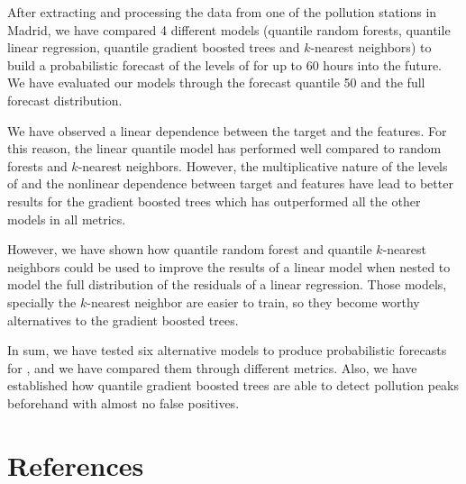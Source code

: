 \documentclass[a4paper,twocolumn,5p]{elsarticle}
\begin{document}
After extracting and processing the data from one of the pollution
stations in Madrid, we have compared 4 different models (quantile
random forests, quantile linear regression, quantile gradient boosted
trees and $k$-nearest neighbors) to build a probabilistic forecast of
the levels of \no for up to 60 hours into the future. We have
evaluated our models through the forecast quantile 50 and the full
forecast distribution.

We have observed a linear dependence between the target and the
features. For this reason, the linear quantile model has performed
well compared to random forests and $k$-nearest neighbors. However,
the multiplicative nature of the levels of \no and the nonlinear
dependence between target and features have lead to better results for
the gradient boosted trees which has outperformed all the other models
in all metrics.

However, we have shown how quantile random forest and quantile
$k$-nearest neighbors could be used to improve the results of a linear
model when nested to model the full distribution of the residuals of a
linear regression. Those models, specially the $k$-nearest neighbor
are easier to train, so they become worthy alternatives to the
gradient boosted trees.

In sum, we have tested six alternative models to produce probabilistic
forecasts for \no, and we have compared them through different
metrics.  Also, we have established how quantile gradient boosted
trees are able to detect pollution peaks beforehand with almost no
false positives.


\section*{References}


\end{document}
